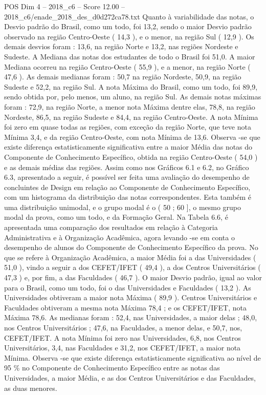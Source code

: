 \begin{textsample}{POS Dim 4 – 2018\_c6 – Score 12.00 – 2018\_c6/enade\_2018\_des\_d0d272ca78.txt}
Quanto à variabilidade das notas, o Desvio padrão do Brasil, como um todo, foi 13,2, sendo o maior Desvio padrão observado na região Centro-Oeste ( 14,3 ), e o menor, na região Sul ( 12,9 ).
Os demais desvios foram : 13,6, na região Norte e 13,2, nas regiões Nordeste e Sudeste.
A Mediana das notas dos estudantes de todo o Brasil foi 51,0.
A maior Mediana ocorreu na região Centro-Oeste ( 55,9 ), e a menor, na região Norte ( 47,6 ).
As demais medianas foram : 50,7 na região Nordeste, 50,9, na região Sudeste e 52,2, na região Sul.
A nota Máxima do Brasil, como um todo, foi 89,9, sendo obtida por, pelo menos, um aluno, na região Sul.
As demais notas máximas foram : 72,9, na região Norte, a menor nota Máxima dentre elas, 78,8, na região Nordeste, 86,5, na região Sudeste e 84,4, na região Centro-Oeste.
A nota Mínima foi zero em quase todas as regiões, com exceção da região Norte, que teve nota Mínima 3,4, e da região Centro-Oeste, com nota Mínima de 13,6.
Observa -se que existe diferença estatisticamente significativa entre a maior Média das notas do Componente de Conhecimento Específico, obtida na região Centro-Oeste ( 54,0 ) e as demais médias das regiões.
Assim como nos Gráficos 6.1 e 6.2, no Gráfico 6.3, apresentado a seguir, é possível ser feita uma avaliação do desempenho de concluintes de Design em relação ao Componente de Conhecimento Específico, com um histograma da distribuição das notas correspondentes.
Esta também é uma distribuição unimodal, e o grupo modal é o ( 50 ; 60 ], o mesmo grupo modal da prova, como um todo, e da Formação Geral.
Na Tabela 6.6, é apresentada uma comparação dos resultados em relação à Categoria Administrativa e à Organização Acadêmica, agora levando -se em conta o desempenho de alunos do Componente de Conhecimento Específico da prova.
No que se refere à Organização Acadêmica, a maior Média foi a das Universidades ( 51,0 ), vindo a seguir a dos CEFET/IFET ( 49,4 ), a dos Centros Universitários ( 47,3 ) e, por fim, a das Faculdades ( 46,7 ).
O maior Desvio padrão, igual ao valor para o Brasil, como um todo, foi o das Universidades e Faculdades ( 13,2 ).
As Universidades obtiveram a maior nota Máxima ( 89,9 ).
Centros Universitários e Faculdades obtiveram a mesma nota Máxima 78,4 ; e os CEFET/IFET, nota Máxima 78,6.
As medianas foram : 52,4, nas Universidades, a maior delas ; 48,0, nos Centros Universitários ; 47,6, na Faculdades, a menor delas, e 50,7, nos, CEFET/IFET.
A nota Mínima foi zero nas Universidades, 6,8, nos Centros Universitários, 3,4, nas Faculdades e 31,2, nos CEFET/IFET, a maior nota Mínima.
Observa -se que existe diferença estatisticamente significativa ao nível de 95 \% no Componente de Conhecimento Específico entre as notas das Universidades, a maior Média, e as dos Centros Universitários e das Faculdades, as duas menores.

\end{textsample}
